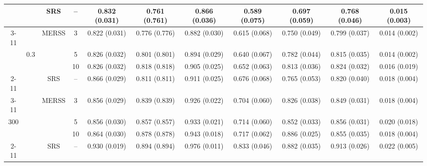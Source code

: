 \documentclass[twoside]{article}
\begin{document}
\begin{table}[!htb]
{\begin{tabular}{c c c c c c c c c c c}
  \bottomrule 
    
    \multirow{27}{*}{} & 
    \multirow{9}{*}{ }  & 
    \multirow{1}{*}{SRS} & -- 
 &0.832 (0.031) & 0.761 (0.761) & 0.866 (0.036) & 0.589 (0.075) & 0.697 (0.059) & 0.768 (0.046)& 0.015 (0.003)  \\
   
    \cmidrule(lr){3-11}
    &                      & \multirow{3}{*}{MERSS}   &  3   & 
    0.822 (0.031) & 0.776 (0.776) & 0.882 (0.030) & 0.615 (0.068) & 0.750 (0.049) & 0.799 (0.037)& 0.014 (0.002)  \\

    &         0.3             &                                          &  5    &
   0.826 (0.032) & 0.801 (0.801) & 0.894 (0.029) & 0.640 (0.067) & 0.782 (0.044) & 0.815 (0.035)& 0.014 (0.002)  \\

    &                      &                                          &  10   &
 0.826 (0.032) & 0.818 (0.818) & 0.905 (0.025) & 0.652 (0.063) & 0.813 (0.036) & 0.824 (0.032)& 0.016 (0.019)  \\

    
 \cmidrule(lr){2-11}
  &\multirow{9}{*}{ }  & 
   \multirow{1}{*}{SRS} & -- 
 &0.866 (0.029) & 0.811 (0.811) & 0.911 (0.025) & 0.676 (0.068) & 0.765 (0.053) & 0.820 (0.040)& 0.018 (0.004)  \\
    
    \cmidrule(lr){3-11}
    &                      & \multirow{3}{*}{MERSS}   &  3   & 
    0.856 (0.029) & 0.839 (0.839) & 0.926 (0.022) & 0.704 (0.060) & 0.826 (0.038) & 0.849 (0.031)& 0.018 (0.004)  \\

  300 &          0.5            &                                          &  5    &
   0.856 (0.030) & 0.857 (0.857) & 0.933 (0.021) & 0.714 (0.060) & 0.852 (0.033) & 0.856 (0.031)& 0.020 (0.018)  \\

    &                      &                                          &  10   &
    0.864 (0.030) & 0.878 (0.878) & 0.943 (0.018) & 0.717 (0.062) & 0.886 (0.025) & 0.855 (0.035)& 0.018 (0.004)  \\


  

    \cmidrule(lr){2-11}
 &\multirow{9}{*}{ }  & 
    \multirow{1}{*}{SRS} & -- 
 &0.930 (0.019) & 0.894 (0.894) & 0.976 (0.011) & 0.833 (0.046) & 0.882 (0.035) & 0.913 (0.026)& 0.022 (0.005)  \\
    

\end{tabular}}
\end{table}
\end{document}
